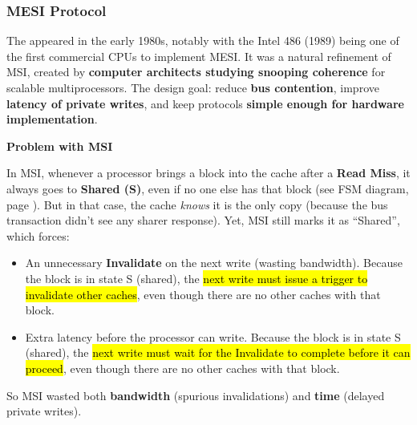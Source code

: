 \subsubsection{MESI Protocol}

The  appeared in the early 1980s, notably with the Intel 486 (1989) being one of the first commercial CPUs to implement MESI. It was a natural refinement of MSI, created by \textbf{computer architects studying snooping coherence} for scalable multiprocessors. The design goal: reduce \textbf{bus contention}, improve \textbf{latency of private writes}, and keep protocols \textbf{simple enough for hardware implementation}.

\highspace
\begin{flushleft}
    \textcolor{Red2}{ \textbf{Problem with MSI}}
\end{flushleft}
In MSI, whenever a processor brings a block into the cache after a \textbf{Read Miss}, it always goes to \textbf{Shared (S)}, even if no one else has that block (see FSM diagram, page \pageref{fig: msi-finite-state-machine}). But in that case, the cache \emph{knows} it is the only copy (because the bus transaction didn't see any sharer response). Yet, MSI still marks it as ``Shared'', which forces:
\begin{itemize}
    \item An unnecessary \textbf{Invalidate} on the next write (wasting bandwidth). Because the block is in state S (shared), the \hl{next write must issue a trigger to invalidate other caches}, even though there are no other caches with that block.
    \item Extra latency before the processor can write. Because the block is in state S (shared), the \hl{next write must wait for the Invalidate to complete before it can proceed}, even though there are no other caches with that block.
\end{itemize}
So MSI wasted both \textbf{bandwidth} (spurious invalidations) and \textbf{time} (delayed private writes).

